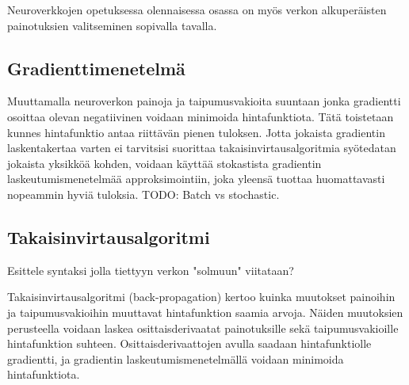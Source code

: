\documentclass[finnish]{tktltiki2}
\theoremstyle{definition}
\theoremstyle{remark}
\begin{document}
  Neuroverkkojen opetuksessa olennaisessa osassa on myös verkon alkuperäisten painotuksien valitseminen sopivalla tavalla.

  \subsection{Gradienttimenetelmä} %

  Muuttamalla neuroverkon painoja ja taipumusvakioita suuntaan jonka gradientti osoittaa olevan negatiivinen voidaan minimoida hintafunktiota. Tätä toistetaan kunnes hintafunktio antaa riittävän pienen tuloksen. Jotta jokaista gradientin laskentakertaa varten ei tarvitsisi suorittaa takaisinvirtausalgoritmia syötedatan jokaista yksikköä kohden, voidaan käyttää stokastista gradientin laskeutumismenetelmää approksimointiin, joka yleensä tuottaa huomattavasti nopeammin hyviä tuloksia. TODO: Batch vs stochastic.



  \subsection{Takaisinvirtausalgoritmi}

  Esittele syntaksi jolla tiettyyn verkon "solmuun" viitataan?

  Takaisinvirtausalgoritmi (back-propagation) kertoo kuinka muutokset painoihin ja taipumusvakioihin muuttavat hintafunktion saamia arvoja. Näiden muutoksien perusteella voidaan laskea osittaisderivaatat painotuksille sekä taipumusvakioille hintafunktion suhteen. Osittaisderivaattojen avulla saadaan hintafunktiolle gradientti, ja gradientin laskeutumismenetelmällä voidaan minimoida hintafunktiota.
  
\end{document}
